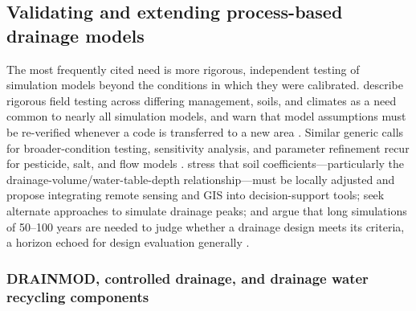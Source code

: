 \subsection{Validating and extending process-based drainage models}

The most frequently cited need is more rigorous, independent testing of
simulation models beyond the conditions in which they were calibrated.
\textcite{Youssef2006} describe rigorous field testing across differing
management, soils, and climates as a need common to nearly all simulation
models, and warn that model assumptions must be re-verified whenever a code is
transferred to a new area \parencite{Kelleners2000}. Similar generic calls for
broader-condition testing, sensitivity analysis, and parameter refinement recur
for pesticide, salt, and flow models
\parencite{Branger2009,Hirekhan2007,Yang2008b,Xian2017}. \textcite{Yang2008b}
stress that soil coefficients---particularly the
drainage-volume/water-table-depth relationship---must be locally adjusted and
propose integrating remote sensing and GIS into decision-support tools;
\textcite{Xian2017} seek alternate approaches to simulate drainage peaks; and
\textcite{Mendez2004} argue that long simulations of 50--100 years are needed to
judge whether a drainage design meets its criteria, a horizon echoed for design
evaluation generally \parencite{Wang2006b,Ale2009,Malota2015,Häggblom2019}.

\subsubsection{DRAINMOD, controlled drainage, and drainage water recycling components}

